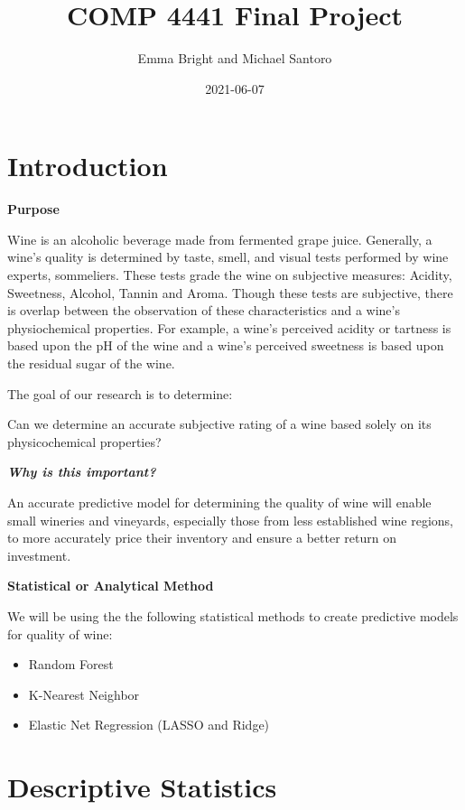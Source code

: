 \documentclass[
]{book}
\title{COMP 4441 Final Project}
\author{Emma Bright and Michael Santoro}
\date{2021-06-07}
\providecommand{\tightlist}{%
  \setlength{\itemsep}{0pt}\setlength{\parskip}{0pt}}
\begin{document}
\maketitle

{
\setcounter{tocdepth}{1}
\tableofcontents
}
\hypertarget{introduction}{%
\chapter{Introduction}\label{introduction}}

\textbf{Purpose}

Wine is an alcoholic beverage made from fermented grape juice. \citet{wine_exactly_web} Generally, a wine's quality is determined by taste, smell, and visual tests performed by wine experts, sommeliers. These tests grade the wine on subjective measures: Acidity, Sweetness, Alcohol, Tannin and Aroma. Though these tests are subjective, there is overlap between the observation of these characteristics and a wine's physiochemical properties. For example, a wine's perceived acidity or tartness is based upon the pH of the wine and a wine's perceived sweetness is based upon the residual sugar of the wine.

The goal of our research is to determine:

Can we determine an accurate subjective rating of a wine based solely on its physicochemical properties?

\textbf{\emph{Why is this important?}}

An accurate predictive model for determining the quality of wine will enable small wineries and vineyards, especially those from less established wine regions, to more accurately price their inventory and ensure a better return on investment.

\textbf{Statistical or Analytical Method}

We will be using the the following statistical methods to create predictive models for quality of wine:

\begin{itemize}
\tightlist
\item
  Random Forest
\item
  K-Nearest Neighbor
\item
  Elastic Net Regression (LASSO and Ridge)
\end{itemize}

\hypertarget{descriptive-statistics}{%
\chapter{Descriptive Statistics}\label{descriptive-statistics}}
\end{document}
